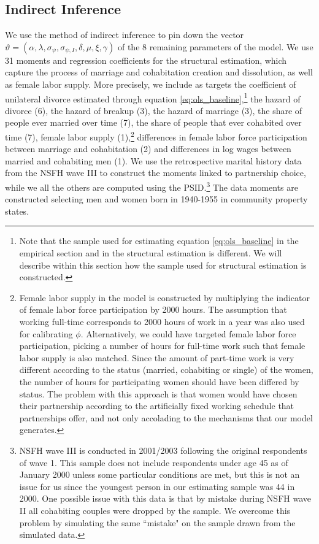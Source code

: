 \documentclass[12pt]{article}
\numberwithin{table}{section}
\begin{document}
\subsection{Indirect Inference}
We use the method of indirect inference \citep{gourieroux1993} to pin down the vector $\vartheta=(\alpha, \lambda, \sigma_\psi, \sigma_{\psi,I}, \delta, \mu, \xi, \gamma )$ of the 8 remaining parameters of the model. We use 31 moments and regression coefficients for the structural estimation, which capture the process of marriage and cohabitation creation and dissolution, as well as female labor supply. More precisely, we include as targets the coefficient of unilateral divorce estimated through equation \ref{eq:ols_baseline},\footnote{Note that the sample used for estimating equation \ref{eq:ols_baseline} in the empirical section and in the structural estimation is different. We will describe within this section how the sample used for structural estimation is constructed.} the hazard of divorce (6), the hazard of breakup (3), the hazard of marriage (3), the share of people ever married over time (7), the share of people that ever cohabited over time (7), female labor supply (1),\footnote{Female labor supply in the model is constructed by multiplying the indicator of female labor force participation by 2000 hours. The assumption that working full-time corresponds to 2000 hours of work in a year was also used for calibrating $\phi$. Alternatively, we could have targeted female labor force participation, picking a number of hours for full-time work such that female labor supply is also matched.  Since the amount of part-time work is very different according to the status (married, cohabiting or single) of the women, the number of hours for participating women should have been differed by status. The problem with this approach is that women would have chosen their partnership according to the artificially fixed working schedule that partnerships offer, and not only accolading to the mechanisms that our model generates.} differences in female labor force participation between marriage and cohabitation (2) and differences in log wages between married and cohabiting men (1). We use the retrospective marital history data from the NSFH wave III to construct the moments linked to partnership choice, while we all the others are computed using the PSID.\footnote{NSFH wave III is conducted in 2001/2003 following the original respondents of wave 1. This sample does not include respondents under age 45 as of January 2000 unless some particular conditions are met, but this is not an issue for us since the youngest person in our estimating sample was 44 in 2000. One possible issue with this data is that by mistake during NSFH wave II all cohabiting couples were dropped by the sample. We overcome this problem by simulating the same ``mistake" on the sample drawn from the simulated data.} The data moments are constructed selecting men and women born in 1940-1955 in community property states.
\end{document}
